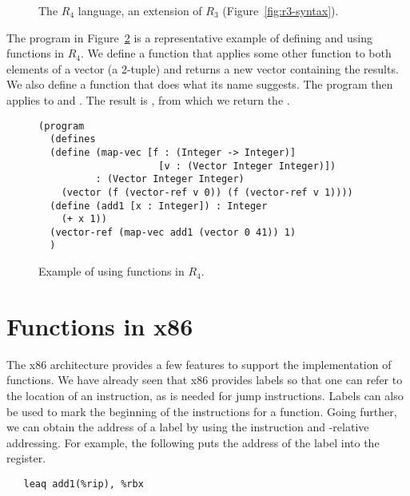 \documentclass[11pt]{book}
\begin{document}
\begin{figure}[tbp]
\centering
{}
\caption{The $R_4$ language, an extension of $R_3$
  (Figure~\ref{fig:r3-syntax}).}
\label{fig:r4-syntax}
\end{figure}

The program in Figure~\ref{fig:r4-function-example} is a
representative example of defining and using functions in $R_4$.  We
define a function  that applies some other function
 to both elements of a vector (a 2-tuple) and returns a new
vector containing the results. We also define a function 
that does what its name suggests. The program then applies
 to  and .  The result is
, from which we return the .

\begin{figure}[tbp]
\begin{lstlisting}
(program
  (defines
  (define (map-vec [f : (Integer -> Integer)]
                     [v : (Vector Integer Integer)])
          : (Vector Integer Integer)
    (vector (f (vector-ref v 0)) (f (vector-ref v 1))))
  (define (add1 [x : Integer]) : Integer
    (+ x 1))
  (vector-ref (map-vec add1 (vector 0 41)) 1)
  )
\end{lstlisting}
\caption{Example of using functions in $R_4$.}
\label{fig:r4-function-example}
\end{figure}



\section{Functions in x86}
\label{sec:fun-x86}

The x86 architecture provides a few features to support the
implementation of functions. We have already seen that x86 provides
labels so that one can refer to the location of an instruction, as is
needed for jump instructions. Labels can also be used to mark the
beginning of the instructions for a function.  Going further, we can
obtain the address of a label by using the  instruction and
-relative addressing. For example, the following puts the
address of the  label into the  register.
\begin{lstlisting}
   leaq add1(%rip), %rbx
\end{lstlisting}
\end{document}
